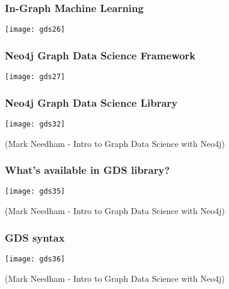 \begin{frame}[fragile]\frametitle{In-Graph Machine Learning}

\begin{center}
\texttt{[image: gds26]}
\end{center}

\end{frame}

\begin{frame}[fragile]\frametitle{Neo4j Graph Data Science Framework}

\begin{center}
\texttt{[image: gds27]}
\end{center}

\end{frame}

\begin{frame}[fragile]\frametitle{Neo4j Graph Data Science Library}

\begin{center}
\texttt{[image: gds32]}

{\tiny (Mark Needham - Intro to Graph Data Science with Neo4j)}

\end{center}

\end{frame}

\begin{frame}[fragile]\frametitle{What’s available in GDS library?}

\begin{center}
\texttt{[image: gds35]}

{\tiny (Mark Needham - Intro to Graph Data Science with Neo4j)}

\end{center}

\end{frame}


\begin{frame}[fragile]\frametitle{GDS syntax}

\begin{center}
\texttt{[image: gds36]}

{\tiny (Mark Needham - Intro to Graph Data Science with Neo4j)}

\end{center}

\end{frame}



